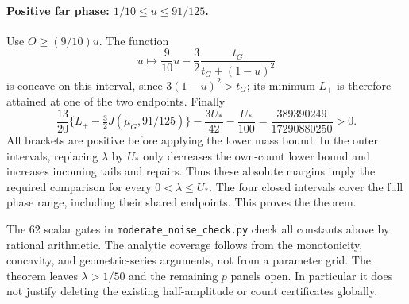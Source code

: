 \paragraph{Positive far phase: $1/10\le u\le91/125$.}
Use $O\ge(9/10)u$. The function
\[
            u\longmapsto\frac9{10}u-\frac32\frac{t_G}{t_G+(1-u)^2}
\]
is concave on this interval, since $3(1-u)^2>t_G$; its minimum
$L_+$ is therefore attained at one of the two endpoints. Finally
\[
 \frac{13}{20}\{L_+-\tfrac32J(\mu_G,91/125)\}
       -\frac{3U_*}{42}-\frac{U_*}{100}
                      =\frac{389390249}{17290880250}>0.
\]
All brackets are positive before applying the lower mass bound.
In the outer intervals, replacing $\lambda$ by $U_*$ only decreases
the own-count lower bound and increases incoming tails and repairs.
Thus these absolute margins imply the required comparison for every
$0<\lambda\le U_*$. The four closed intervals cover the full phase
range, including their shared endpoints. This proves the theorem.

The 62 scalar gates in \texttt{moderate\_noise\_check.py} check all
constants above by rational arithmetic. The analytic coverage follows
from the monotonicity, concavity, and geometric-series arguments, not
from a parameter grid. The theorem leaves $\lambda>1/50$ and the
remaining $p$ panels open. In particular it does not justify deleting
the existing half-amplitude or count certificates globally.
